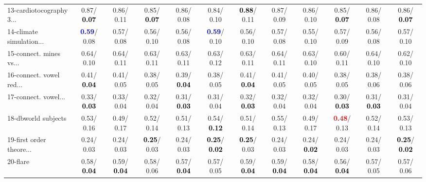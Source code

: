 \begin{table}[h]
\begin{center}
{\begin{tabular}{lc|c|c|c|c|c|c|c|c|c|c}
13-cardiotocography 3... &   0.87/\textcolor{black}{\textbf{  0.07}} &   0.86/  0.11 &   0.85/\textcolor{black}{\textbf{  0.07}} &   0.86/  0.08 &   0.84/  0.10 & \textcolor{black}{\textbf{  0.88}}/  0.11 &   0.87/  0.09 &   0.86/  0.10 &   0.85/\textcolor{black}{\textbf{  0.07}} &   0.86/  0.08 &   0.86/\textcolor{black}{\textbf{  0.07}} \\
14-climate simulation... & \textcolor{blue}{\textbf{  0.59}}/  0.08 &   0.57/  0.08 &   0.56/  0.10 &   0.56/  0.08 & \textcolor{blue}{\textbf{  0.59}}/  0.10 &   0.56/  0.10 &   0.57/  0.08 &   0.55/  0.10 &   0.57/  0.09 &   0.56/  0.08 &   0.57/  0.10 \\ \hline
15-connect. mines vs... &   0.64/  0.10 &   0.64/  0.11 &   0.63/  0.11 &   0.63/  0.11 &   0.63/  0.12 &   0.63/  0.11 &   0.64/  0.11 &   0.63/  0.10 &   0.60/  0.11 &   0.64/  0.10 &   0.62/  0.10 \\
16-connect. vowel red... &   0.41/\textcolor{black}{\textbf{  0.04}} &   0.41/  0.05 &   0.38/  0.05 &   0.39/\textcolor{black}{\textbf{  0.04}} &   0.38/  0.05 &   0.41/\textcolor{black}{\textbf{  0.04}} &   0.41/  0.05 &   0.40/  0.05 &   0.38/  0.05 &   0.38/  0.06 &   0.38/  0.06 \\
17-connect. vowel... &   0.33/\textcolor{black}{\textbf{  0.03}} &   0.33/  0.04 &   0.32/  0.04 &   0.31/\textcolor{black}{\textbf{  0.03}} &   0.31/  0.04 &   0.32/\textcolor{black}{\textbf{  0.03}} &   0.32/  0.04 &   0.32/  0.04 &   0.30/\textcolor{black}{\textbf{  0.03}} &   0.31/\textcolor{black}{\textbf{  0.03}} &   0.31/  0.04 \\
18-dbworld subjects &   0.53/  0.16 &   0.49/  0.17 &   0.52/  0.14 &   0.51/  0.13 &   0.54/\textcolor{black}{\textbf{  0.12}} &   0.51/  0.14 &   0.55/  0.13 &   0.49/  0.17 & \textcolor{red}{\textbf{  0.48}}/  0.13 &   0.52/  0.14 &   0.53/  0.13 \\
19-first order theore... &   0.24/  0.03 &   0.24/  0.03 & \textcolor{black}{\textbf{  0.25}}/  0.03 &   0.24/  0.03 & \textcolor{black}{\textbf{  0.25}}/\textcolor{black}{\textbf{  0.02}} & \textcolor{black}{\textbf{  0.25}}/  0.03 &   0.24/  0.03 &   0.24/\textcolor{black}{\textbf{  0.02}} &   0.24/  0.03 &   0.24/  0.03 & \textcolor{black}{\textbf{  0.25}}/\textcolor{black}{\textbf{  0.02}} \\
20-flare &   0.58/\textcolor{black}{\textbf{  0.04}} &   0.59/\textcolor{black}{\textbf{  0.04}} &   0.58/  0.06 &   0.57/\textcolor{black}{\textbf{  0.04}} &   0.57/  0.05 &   0.59/\textcolor{black}{\textbf{  0.04}} &   0.59/\textcolor{black}{\textbf{  0.04}} &   0.58/\textcolor{black}{\textbf{  0.04}} &   0.56/\textcolor{black}{\textbf{  0.04}} &   0.57/  0.05 &   0.57/  0.06 \\

\end{tabular}}
\end{center}
\end{table}
